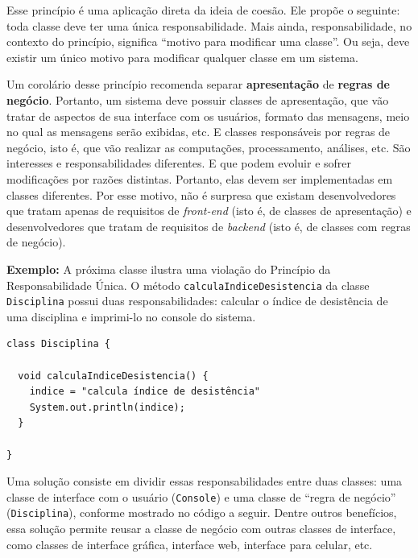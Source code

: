 \documentclass[
  11pt,
  twoside]{book}
\newcommand{\passthrough}[1]{#1}
\begin{document}

Esse princípio é uma aplicação direta da ideia de coesão. Ele propõe o
seguinte: toda classe deve ter uma única responsabilidade. Mais ainda,
responsabilidade, no contexto do princípio, significa ``motivo para
modificar uma classe''. Ou seja, deve existir um único motivo para
modificar qualquer classe em um sistema.

Um corolário desse princípio recomenda separar \textbf{apresentação} de
\textbf{regras de negócio}. Portanto, um sistema deve possuir classes de
apresentação, que vão tratar de aspectos de sua interface com os
usuários, formato das mensagens, meio no qual as mensagens serão
exibidas, etc. E classes responsáveis por regras de negócio, isto é, que
vão realizar as computações, processamento, análises, etc. São
interesses e responsabilidades diferentes. E que podem evoluir e sofrer
modificações por razões distintas. Portanto, elas devem ser
implementadas em classes diferentes. Por esse motivo, não é surpresa que
existam desenvolvedores que tratam apenas de requisitos de
\emph{front-end} (isto é, de classes de apresentação) e desenvolvedores
que tratam de requisitos de \emph{backend} (isto é, de classes com
regras de negócio).

\textbf{Exemplo:} A próxima classe ilustra uma violação do Princípio da
Responsabilidade Única. O método
\passthrough{\lstinline!calculaIndiceDesistencia!} da classe
\passthrough{\lstinline!Disciplina!} possui duas responsabilidades:
calcular o índice de desistência de uma disciplina e imprimi-lo no
console do sistema.

\begin{lstlisting}
class Disciplina {

  void calculaIndiceDesistencia() {
    indice = "calcula índice de desistência"
    System.out.println(indice);
  }

}
\end{lstlisting}

Uma solução consiste em dividir essas responsabilidades entre duas
classes: uma classe de interface com o usuário
(\passthrough{\lstinline!Console!}) e uma classe de ``regra de negócio''
(\passthrough{\lstinline!Disciplina!}), conforme mostrado no código a
seguir. Dentre outros benefícios, essa solução permite reusar a classe
de negócio com outras classes de interface, como classes de interface
gráfica, interface web, interface para celular, etc.

\newpage
\end{document}
